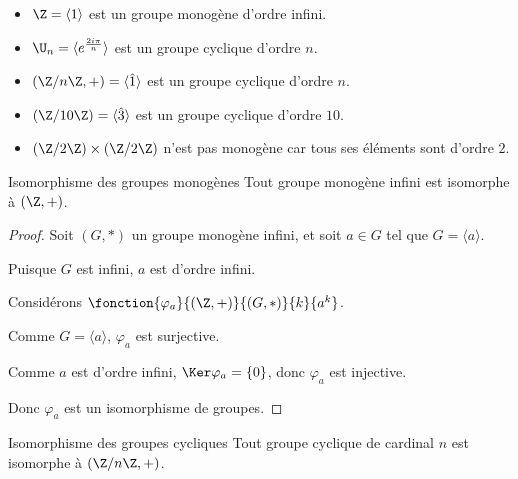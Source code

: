 \begin{exemple}
    \begin{itemize}
        \item $\Z = \langle 1 \rangle$ est un groupe monogène d'ordre infini.
        \item $\U_n = \langle e^{\frac{2i\pi} n} \rangle$ est un groupe cyclique d'ordre $n$.
        \item $(\Z/n\Z, +) = \langle \hat 1 \rangle$ est un groupe cyclique d'ordre $n$.
        \item $(\Z/10\Z) = \langle \hat 3 \rangle$ est un groupe cyclique d'ordre $10$.
        \item $(\Z/2\Z) \times (\Z / 2 \Z)$ n'est pas monogène car tous ses éléments sont d'ordre $2$. 
    \end{itemize}
\end{exemple}

\begin{theoreme}{Isomorphisme des groupes monogènes}{}
    Tout groupe monogène infini est isomorphe à $(\Z, +)$.
\end{theoreme}


\begin{proof}
    Soit $(G, \ast)$ un groupe monogène infini, et soit $a \in G$ tel que $G = \langle a \rangle$.

    Puisque $G$ est infini, $a$ est d'ordre infini.

    Considérons $\fonction{\varphi_a}{(\Z, +)}{(G, \ast)}{k}{a^k}$.

    Comme $G = \langle a \rangle$, $\varphi_a$ est surjective.

    Comme $a$ est d'ordre infini, $\Ker \varphi_a = \{0\}$, donc $\varphi_a$ est injective.

    Donc $\varphi_a$ est un isomorphisme de groupes.
\end{proof}

\begin{theoreme}{Isomorphisme des groupes cycliques}{}
    Tout groupe cyclique de cardinal $n$ est isomorphe à $(\Z/n\Z, +)$.
\end{theoreme}


